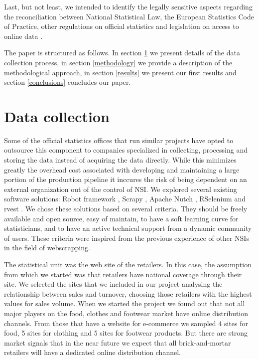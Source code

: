 \documentclass[]{article}
\begin{document}
Last, but not least, we intended to identify the legally sensitive aspects regarding the reconciliation between National Statistical Law, the European Statistics Code of Practice, other regulations on official statistics and legislation on access to online data \cite{swier}.

The paper is structured as follows. In section \ref{section2} we present details of the data collection process, in section \ref{methodology} we provide a description of the methodological approach, in section \ref{results} we present our first results and section \ref{conclusions} concludes our paper.


\section{Data collection}\label{section2}
 
Some of the official statistics offices that run similar projects have opted to outsource this component to companies specialized 
in collecting, processing and storing the data instead of acquiring the data directly. While this minimizes greatly the overhead 
cost associated with developing and maintaining a large portion of the production pipeline it inccures the risk of being dependent on an external organization out of the control of NSI. We explored several existing software solutions: 
Robot framework \cite{robot2018}, Scrapy \cite{scrapy1, scrapy2}, Apache Nutch \cite{nutch}, RSelenium \cite{rs1} and rvest \cite{rvest}. We chose
these solutions based on several criteria. They should be freely available and open source, easy of maintain, to have a soft learning curve for statisticians, and to have an active technical support from a dynamic community of users. These criteria were inspired from the previous experience of other NSIs in the field of webscrapping.

The statistical unit was the web site of the retailers. In this case, the assumption from which we started was 
that retailers have national coverage through their site. We selected the sites that we included in our project analysing 
the relationship between sales and turnover, choosing those retailers with the highest values for sales volume. 
When we started the project we found out that not all major players on the food, clothes and footwear market have
online distribution channels. From those that have a website for e-commerce we sampled 4 sites for food, 
5 sites for clothing and 5 sites for footwear products. But there are strong market signals that in the near future 
we expect that all brick-and-mortar retailers will have a dedicated online distribution channel.
\end{document}
